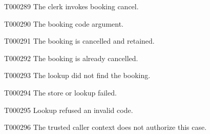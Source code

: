 \documentclass[11pt,a4paper]{article}
\begin{document}
\begin{atlasparagraph}{T000289}
The clerk invokes booking cancel.
\end{atlasparagraph}
\begin{atlasparagraph}{T000290}
The booking code argument.
\end{atlasparagraph}
\begin{atlasparagraph}{T000291}
The booking is cancelled and retained.
\end{atlasparagraph}
\begin{atlasparagraph}{T000292}
The booking is already cancelled.
\end{atlasparagraph}
\begin{atlasparagraph}{T000293}
The lookup did not find the booking.
\end{atlasparagraph}
\begin{atlasparagraph}{T000294}
The store or lookup failed.
\end{atlasparagraph}
\begin{atlasparagraph}{T000295}
Lookup refused an invalid code.
\end{atlasparagraph}
\begin{atlasparagraph}{T000296}
The trusted caller context does not authorize this case.
\end{atlasparagraph}
\end{document}
